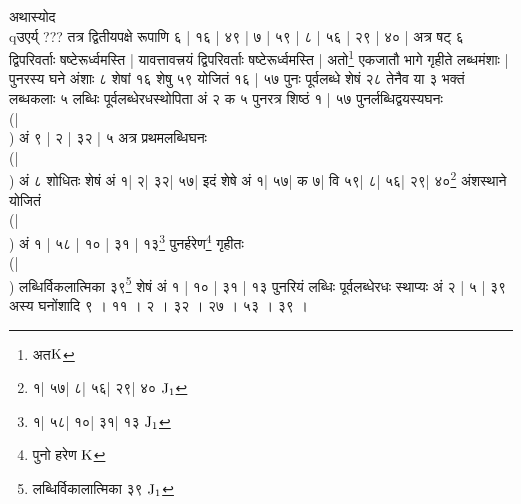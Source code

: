 \documentclass[11pt,a5paper]{book}
\begin{document}
\newpage 
{\s अथास्योद \\qउएर्य् ??? 
तत्र द्वितीयपक्षे रूपाणि ६ | १६ | ४९ | ७ | ५९ | ८ | ५६ | २९ | ४० | 
अत्र षट् ६ द्विपरिवर्ताः षष्टेरूर्ध्वमस्ति | 
यावत्तावत्त्रयं द्विपरिवर्ताः षष्टेरूर्ध्वमस्ति | 
अतो\footnote{{\s अत}${\rm K}$} एकजातौ 
भागे गृहीते लब्धमंशाः | 
पुनरस्य घने अंशाः ८ शेषां १६ शेषु ५९ योजितं
१६ | ५७  पुनः पूर्वलब्धे शेषं २८ तेनैव या ३
भक्तं लब्धकलाः ५ लब्धिः पूर्वलब्धेरधस्थोपिता अं २
क ५ पुनरत्र शिष्ठं १ | ५७ पुनर्लब्धिद्वयस्यघनः\\(|\\)
अं ९ | २ | ३२ | ५ अत्र प्रथमलब्धिघनः\\(|\\)
अं ८ शोधितः शेषं अं १| २| ३२| ५७|
इदं शेषे अं १| ५७| क ७| वि ५९| ८| ५६| २९| ४०\footnote{{\s १| ५७| %
८| ५६| २९| ४० } ${\rm J_1}$}
अंशस्थाने योजितं \\(|\\) अं १ | ५८ | १० | ३१ | १३\footnote{{\s १| ५८| %
 १०| ३१| १३} ${\rm J_1}$}
पुनर्हरेण\footnote{{\s पुनो हरेण} ${\rm K}$}
गृहीतः \\(|\\)
लब्धिर्विकलात्मिका ३९\footnote{{\s लब्धिर्विकालात्मिका ३९ } ${\rm J_1}$}
शेषं अं १ | १० | ३१ | १३ पुनरियं लब्धिः पूर्वलब्धेरधः स्थाप्यः
अं २ | ५ | ३९
अस्य घनोंशादि ९ । ११ । २ । ३२ । २७ । ५३ । ३९ ।}
\end{document}
